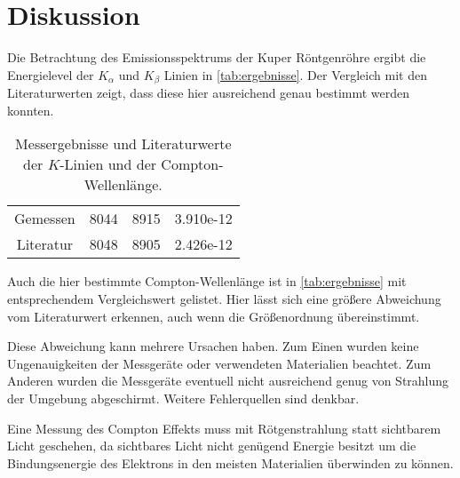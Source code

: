 \section{Diskussion}
\label{sec:Diskussion}


Die Betrachtung des Emissionsspektrums der Kuper Röntgenröhre ergibt die Energielevel der $K_\alpha$ und $K_\beta$ Linien in \autoref{tab:ergebnisse}. Der Vergleich mit den Literaturwerten zeigt, dass diese hier ausreichend genau bestimmt werden konnten.

\begin{table}
    \centering
    \caption{Messergebnisse und Literaturwerte der $K$-Linien und der Compton-Wellenlänge.}
    \begin{tabular}{c S[table-format=4.0] S[table-format=4.0] S[table-format=1.3e-2]}
        \toprule
        &  &  & \\
        \midrule
        Gemessen & 8044 & 8915 & 3.910e-12 \\
        Literatur\cite{xray}\cite{physics_constants} & 8048 & 8905 & 2.426e-12 \\
        \bottomrule
    \end{tabular}
    \label{tab:ergebnisse}
\end{table}

Auch die hier bestimmte Compton-Wellenlänge ist in \autoref{tab:ergebnisse} mit entsprechendem Vergleichswert gelistet.
Hier lässt sich eine größere Abweichung vom Literaturwert erkennen, auch wenn die Größenordnung übereinstimmt.

Diese Abweichung kann mehrere Ursachen haben.
Zum Einen wurden keine Ungenauigkeiten der Messgeräte oder verwendeten Materialien beachtet.
Zum Anderen wurden die Messgeräte eventuell nicht ausreichend genug von Strahlung der Umgebung abgeschirmt.
Weitere Fehlerquellen sind denkbar.

Eine Messung des Compton Effekts muss mit Rötgenstrahlung statt sichtbarem Licht geschehen, da sichtbares Licht nicht genügend Energie besitzt um die Bindungsenergie des Elektrons in den meisten Materialien überwinden zu können.